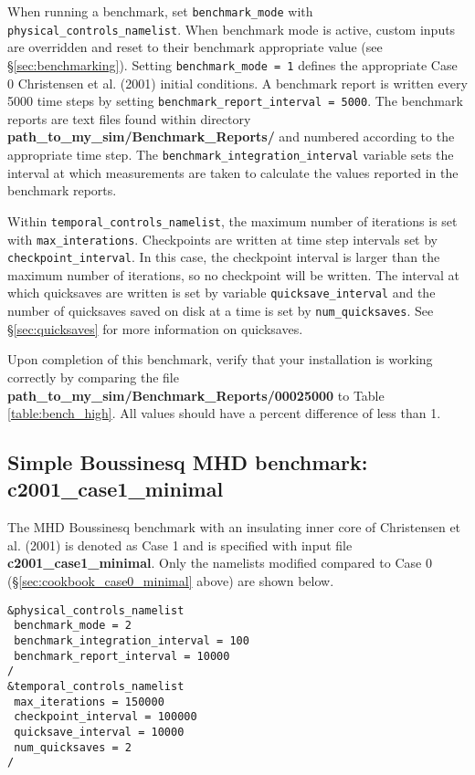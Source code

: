 When running a benchmark, set \texttt{benchmark\_mode} with \texttt{physical\_controls\_namelist}. When benchmark mode is active, custom inputs are overridden and reset to their benchmark appropriate value (see \S \ref{sec:benchmarking}). Setting \texttt{benchmark\_mode = 1} defines the appropriate Case 0 Christensen et al. (2001) initial conditions. A benchmark report is written every 5000 time steps  by setting \texttt{benchmark\_report\_interval = 5000}. The benchmark reports are text files found within directory \textbf{path\_to\_my\_sim/Benchmark\_Reports/} and numbered according to the appropriate time step. The \texttt{benchmark\_integration\_interval} variable sets the interval at which measurements are taken to calculate the values reported in the benchmark reports.    

Within \texttt{temporal\_controls\_namelist}, the maximum number of iterations is set with \texttt{max\_interations}. Checkpoints are written at time step intervals set by \texttt{checkpoint\_interval}. In this case, the checkpoint interval is larger than the maximum number of iterations, so no checkpoint will be written. The interval at which quicksaves are written is set by variable \texttt{quicksave\_interval} and the number of quicksaves saved on disk at a time is set by \texttt{num\_quicksaves}. See \S \ref{sec:quicksaves} for more information on quicksaves. 

Upon completion of this benchmark, verify that your installation is working correctly by comparing the file \\ \textbf{path\_to\_my\_sim/Benchmark\_Reports/00025000} to Table \ref{table:bench_high}. All values should have a percent difference of less than 1. 


\subsection{Simple Boussinesq MHD benchmark: c2001\_case1\_minimal}

The MHD Boussinesq benchmark with an insulating inner core of Christensen et al. (2001) is denoted as Case 1 and is specified with input file \textbf{c2001\_case1\_minimal}. Only the namelists modified compared to Case 0 (\S \ref{sec:cookbook_case0_minimal} above) are shown below.   
    
\begin{lstlisting}
&physical_controls_namelist
 benchmark_mode = 2
 benchmark_integration_interval = 100
 benchmark_report_interval = 10000
/
&temporal_controls_namelist
 max_iterations = 150000
 checkpoint_interval = 100000
 quicksave_interval = 10000
 num_quicksaves = 2
/
\end{lstlisting}    


